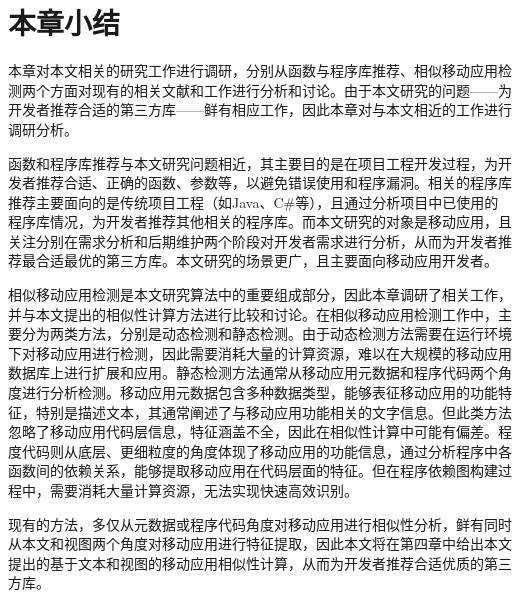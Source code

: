 \section{本章小结}
本章对本文相关的研究工作进行调研，分别从函数与程序库推荐、相似移动应用检测两个方面对现有的相关文献和工作进行分析和讨论。由于本文研究的问题——为开发者推荐合适的第三方库——鲜有相应工作，因此本章对与本文相近的工作进行调研分析。

函数和程序库推荐与本文研究问题相近，其主要目的是在项目工程开发过程，为开发者推荐合适、正确的函数、参数等，以避免错误使用和程序漏洞。相关的程序库推荐主要面向的是传统项目工程（如Java、C\#等），且通过分析项目中已使用的程序库情况，为开发者推荐其他相关的程序库。而本文研究的对象是移动应用，且关注分别在需求分析和后期维护两个阶段对开发者需求进行分析，从而为开发者推荐最合适最优的第三方库。本文研究的场景更广，且主要面向移动应用开发者。

相似移动应用检测是本文研究算法中的重要组成部分，因此本章调研了相关工作，并与本文提出的相似性计算方法进行比较和讨论。在相似移动应用检测工作中，主要分为两类方法，分别是动态检测和静态检测。由于动态检测方法需要在运行环境下对移动应用进行检测，因此需要消耗大量的计算资源，难以在大规模的移动应用数据库上进行扩展和应用。静态检测方法通常从移动应用元数据和程序代码两个角度进行分析检测。移动应用元数据包含多种数据类型，能够表征移动应用的功能特征，特别是描述文本，其通常阐述了与移动应用功能相关的文字信息。但此类方法忽略了移动应用代码层信息，特征涵盖不全，因此在相似性计算中可能有偏差。程度代码则从底层、更细粒度的角度体现了移动应用的功能信息，通过分析程序中各函数间的依赖关系，能够提取移动应用在代码层面的特征。但在程序依赖图构建过程中，需要消耗大量计算资源，无法实现快速高效识别。

现有的方法，多仅从元数据或程序代码角度对移动应用进行相似性分析，鲜有同时从本文和视图两个角度对移动应用进行特征提取，因此本文将在第四章中给出本文提出的基于文本和视图的移动应用相似性计算，从而为开发者推荐合适优质的第三方库。




	